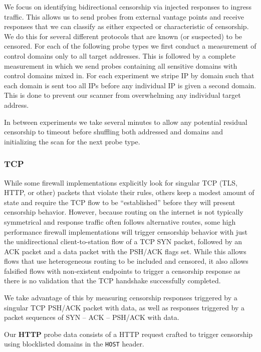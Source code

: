 We focus on identifying bidirectional censorship via injected responses to
ingress traffic. This allows us to send probes from external vantage points and
receive responses that we can classify as either expected or characteristic of
censorship. We do this for several different protocols that are known (or
suspected) to be censored. For each of the following probe types we first
conduct a measurement of control domains only to all target addresses. This is
followed by a complete measurement in which we send probes containing all
sensitive domains with control domains mixed in. For each experiment we stripe
IP by domain such that each domain is sent too all IPs before any individual IP
is given a second domain. This is done to prevent our scanner from overwhelming
any individual target address.

In between experiments we take several minutes to allow any potential residual
censorship to timeout before shuffling both addressed and domains and
initializing the scan for the next probe type.

\subsubsection{TCP}
While some firewall implementations explicitly look for singular TCP (TLS, HTTP,
or other) packets that violate their rules, others keep a modest amount of state
and require the TCP flow to be ``established'' before they will present
censorship behavior. However, because routing on the internet is not typically
symmetrical and response traffic often follows alternative routes, some high
performance firewall implementations will trigger censorship behavior with just
the unidirectional client-to-station flow of a TCP SYN packet, followed by an
ACK packet and a data packet with the PSH/ACK flags set. While this allows flows
that use heterogeneous routing to be included and censored, it also allows
falsified flows with non-existent endpoints to trigger a censorship response as
there is no validation that the TCP handshake successfully completed.

We take advantage of this by measuring censorship responses triggered by a
singular TCP PSH/ACK packet with data, as well as responses triggered by a
packet sequences of SYN -- ACK -- PSH/ACK with data.

Our \textbf{HTTP} probe data consists of a HTTP request crafted to trigger
censorship using blocklisted domains in the \texttt{HOST} header.

